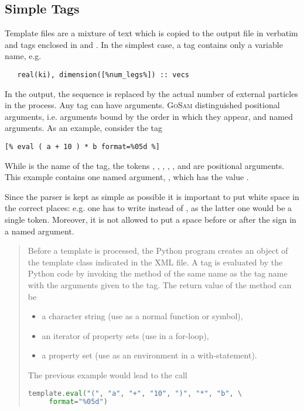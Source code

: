 \documentclass[11pt,a4paper]{refrep}
\newcommand{\golem}{\textsc{GoSam}\xspace}
\begin{document}
\subsection{Simple Tags}
Template files are a mixture of text which is copied to the output file in
verbatim and tags enclosed in \lit{[\%} and \lit{\%]}. In the simplest
case, a tag contains only a variable name, e.g.
\begin{lstlisting}
   real(ki), dimension([%num_legs%]) :: vecs
\end{lstlisting}
In the output, the sequence  is replaced by the
actual number of external particles in the process.
Any tag can have arguments. \golem{} distinguished positional arguments,
i.e. arguments bound by the order in which they appear, and named
arguments. As an example, consider the tag
\begin{lstlisting}
[% eval ( a + 10 ) * b format=%05d %]
\end{lstlisting}
While  is the name of the tag, the tokens
\lit{(}, , \lit{+}, , \lit{)}, \lit{*} and 
are positional arguments. This example contains one named argument,
, which has the value .

\attention{} Since the parser is
kept as simple as possible it is important to put white space in
the correct places: e.g. one has to write  instead of
, as the latter one would be a single token. Moreover,
it is not allowed to put a space before or after the \lit{=} sign
in a named argument.

\begin{quotation}
\small\sf
Before a template is processed, the Python program creates an
object of the template class indicated in the XML file.
A tag is evaluated by the Python code by invoking the method
of the same name as the tag name with the arguments given to the tag.
The return value of the method can be
\begin{itemize}
\item a character string (use as a normal function or symbol),
\item an iterator of property sets (use in a for-loop),
\item a property set (use as an environment in a with-statement).
\end{itemize}
The previous example would lead to the call
\begin{lstlisting}[language=Python]
template.eval("(", "a", "+", "10", ")", "*", "b", \
     format="%05d")
\end{lstlisting}
\end{quotation}
\end{document}
